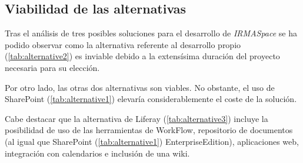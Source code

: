 \subsection{Viabilidad de las alternativas}

\par Tras el análisis de tres posibles soluciones para el desarrollo de \textit{IRMASpace} se ha podido observar como la alternativa referente al desarrollo propio (\ref{tab:alternative2}) es inviable debido a la extensísima duración del proyecto necesaria para su elección.

\par Por otro lado, las otras dos alternativas son viables. No obstante, el uso de SharePoint (\ref{tab:alternative1}) elevaría considerablemente el coste de la solución.

\par Cabe destacar que la alternativa de Liferay (\ref{tab:alternative3}) incluye la posibilidad de uso de las herramientas de WorkFlow, repositorio de documentos (al igual que  SharePoint (\ref{tab:alternative1}) EnterpriseEdition), aplicaciones web, integración con calendarios e inclusión de una wiki.
